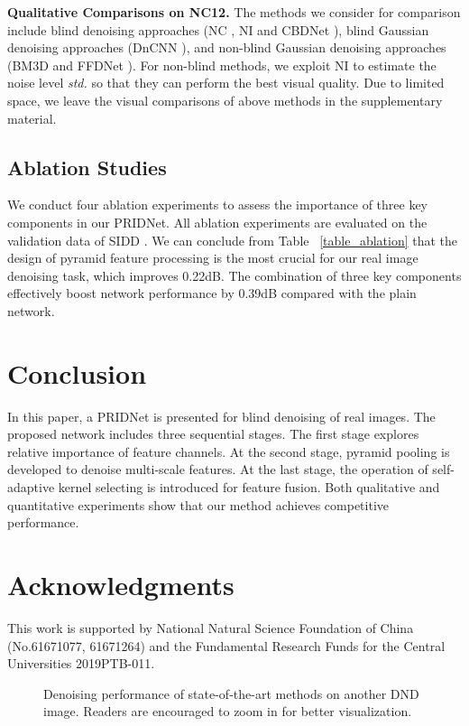 \documentclass[conference]{IEEEtran}
\begin{document}
\textbf{Qualitative Comparisons on NC12.}  The methods we consider for comparison include blind denoising approaches (NC \cite{NC}, NI and CBDNet \cite{CBDNet}), blind Gaussian denoising approaches (DnCNN \cite{DnCNN}), and non-blind Gaussian denoising approaches (BM3D \cite{BM3D} and FFDNet \cite{FFDNet}). For non-blind methods, we exploit NI to estimate the noise level \emph{std.} so that they can perform the best visual quality. Due to limited space, we leave the visual comparisons of above methods in the supplementary material.

\subsection{Ablation Studies}
We conduct four ablation experiments to assess the importance of three key components in our PRIDNet. All ablation experiments are evaluated on the validation data of SIDD \cite{SIDD}. We can conclude from Table ~\ref{table_ablation} that the design of pyramid feature processing is the most crucial for our real image denoising task, which improves 0.22dB. The combination of three key components effectively boost network performance by 0.39dB compared with the plain network.
\section{Conclusion}
In this paper, a PRIDNet is presented for blind denoising of real images. The proposed network includes three sequential stages. The first stage explores relative importance of feature channels. At the second stage, pyramid pooling is developed to denoise multi-scale features. At the last stage, the operation of self-adaptive kernel selecting is introduced for feature fusion. Both qualitative and quantitative experiments show that our method achieves competitive performance.
\section*{Acknowledgments}
This work is supported by National Natural Science Foundation of China (No.61671077, 61671264) and the Fundamental Research Funds for the Central Universities 2019PTB-011.




\begin{figure*}[p]
\centering
{}\quad
{}

\centering
\caption{Denoising performance of state-of-the-art methods on another DND image. Readers are encouraged to zoom in for better visualization.}
\label{fig_DND-2}
\end{figure*}
\end{document}
